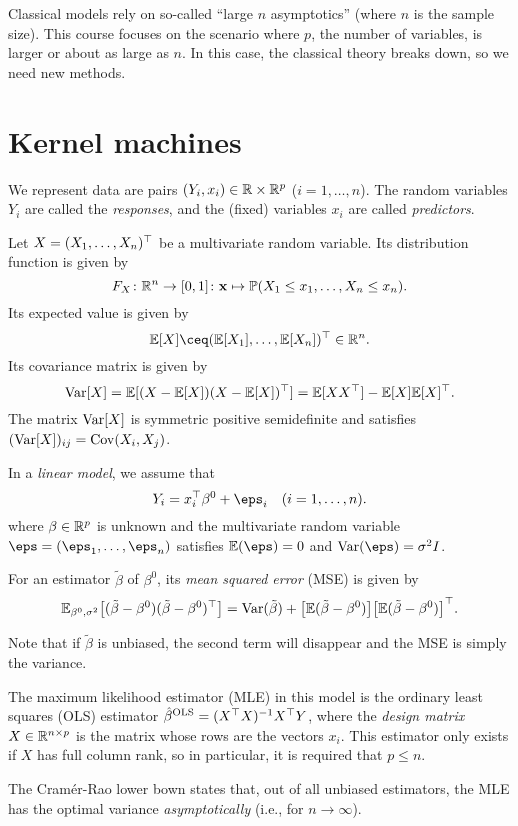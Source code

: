 Classical models rely on so-called ``large $n$ asymptotics'' (where $n$ is the sample size). This course focuses on the scenario where $p$, the number of variables, is larger or about as large as $n$. In this case, the classical theory breaks down, so we need new methods. 

\section{Kernel machines}
We represent data are pairs $(Y_i, x_i) \in \mathbb R \times \mathbb R^p$ ($i = 1, \dotsc, n$). The random variables $Y_i$ are called the \emph{responses}, and the (fixed) variables $x_i$ are called \emph{predictors}. 

\begin{recap}
    Let $X = (X_1, \dotsc, X_n)^\top$ be a multivariate random variable. Its distribution function is given by
    \[
    F_{X} \colon \mathbb R^n \to [0, 1] \colon \mathbf x \mapsto \mathbb P(X_1 \leq x_1, \dotsc, X_n \leq x_n). 
    \]
    Its expected value is given by
    \[
    \EE[X] \ceq (\EE[X_1], \dotsc, \EE[X_n])\T \in \RR^n. 
    \]
    Its covariance matrix is given by 
    \[
    \operatorname{Var}[X] = \mathbb E[(X - \mathbb E[X])(X - \mathbb E[X])^\top] = \mathbb E[XX^\top] - \mathbb E[X] \mathbb E[X]^\top. 
    \]
    The matrix $\operatorname{Var}[X]$ is symmetric positive semidefinite and satisfies $(\operatorname{Var}[X])_{ij} = \operatorname{Cov}(X_i, X_j)$. 
\end{recap}
\begin{definition}
    In a \emph{linear model}, we assume that 
    \[
    Y_i = x_i\T \beta^0 + \eps_i \quad (i = 1, \dotsc, n). 
    \]
    where $\beta \in \mathbb R^p$ is unknown and the multivariate random variable $\eps = (\eps_1, \dotsc, \eps_n)$ satisfies $\EE (\eps) = 0$ and $\Var(\eps) = \sigma^2 I$. 
\end{definition}

\begin{definition}
    For an estimator $\tilde\beta$ of $\beta^0$, its \emph{mean squared error} (MSE) is given by 
    \[
    \mathbb E_{\beta^0, \sigma^2} \qty[(\tilde\beta - \beta^0)(\tilde\beta - \beta^0)^\top]  = \operatorname{Var}(\tilde\beta) + \qty[\mathbb E(\tilde\beta - \beta^0)]\qty[\mathbb E(\tilde\beta - \beta^0)]^\top. 
    \]
\end{definition}
Note that if $\tilde\beta$ is unbiased, the second term will disappear and the MSE is simply the variance. 

\begin{recap}
    The maximum likelihood estimator (MLE) in this model is the ordinary least squares (OLS) estimator $\hat\beta^\mathrm{OLS} = (X^\top X)^{-1} X^\top Y$, where the \emph{design matrix} $X \in \mathbb R^{n \times p}$ is the matrix whose rows are the vectors $x_i$. This estimator only exists if $X$ has full column rank, so in particular, it is required that $p \leq n$. 
    
    The Cramér-Rao lower bown states that, out of all unbiased estimators, the MLE has the optimal variance \emph{asymptotically} (i.e., for $n \to\infty$). 
\end{recap}

